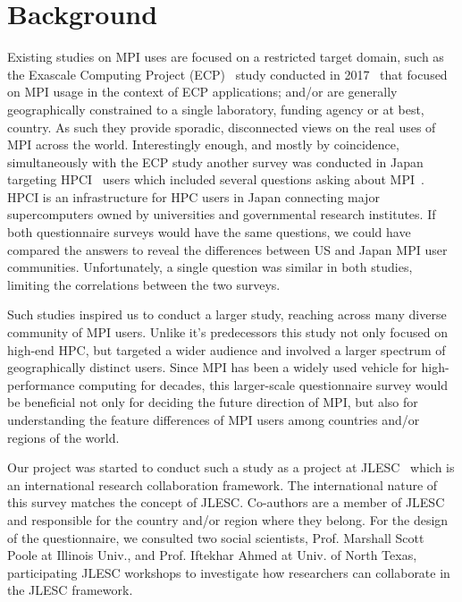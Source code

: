 \documentclass[conference,10pt,letterpaper]{IEEEtran}
\begin{document}
\section{Background}

Existing studies on MPI uses are focused on a restricted target
domain, such as the Exascale Computing Project (ECP)~\cite{ECP} study
conducted in 2017~\cite{osti_1462877} that focused on MPI usage in the
context of ECP applications; and/or are generally geographically
constrained to a single laboratory, funding agency or at best,
country. As such they provide sporadic, disconnected views on the real
uses of MPI across the world.
%
Interestingly enough, and mostly by coincidence, simultaneously with
the ECP study another survey was conducted in Japan targeting
HPCI~\cite{HPCI} users which included several questions asking about
MPI~\cite{hpci-user-survey}.  HPCI is an infrastructure for HPC users
in Japan connecting major supercomputers owned by universities and
governmental research institutes. If both questionnaire surveys would
have the same questions, we could have compared the answers to reveal
the differences between US and Japan MPI user
communities. Unfortunately, a single question was similar in both
studies, limiting the correlations between the two surveys.

Such studies inspired us to conduct a larger study, reaching across
many diverse community of MPI users. Unlike it's predecessors this
study not only focused on high-end HPC, but targeted a wider audience
and involved a larger spectrum of geographically distinct users. Since
MPI has been a widely used vehicle for high-performance computing for
decades, this larger-scale questionnaire survey would be beneficial
not only for deciding the future direction of MPI, but also for
understanding the feature differences of MPI users among countries
and/or regions of the world.

Our project was started to conduct such a study as a project at
JLESC~\cite{JLESC} which is an international research collaboration
framework. The international nature of this survey matches the concept
of JLESC. Co-authors are a member of JLESC and responsible for the
country and/or region where they belong. For the design of the questionnaire,
we consulted two social scientists, Prof. Marshall Scott Poole at
Illinois Univ., and Prof. Iftekhar Ahmed at Univ. of North Texas,
participating JLESC workshops to investigate how researchers can
collaborate in the JLESC framework. 
\end{document}
